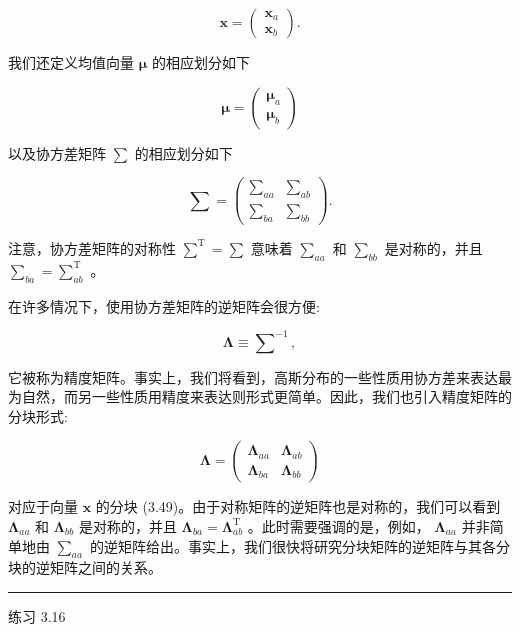 \documentclass[10pt]{article}
\newcommand{\HRule}{\begin{center}\rule{0.9\linewidth}{0.2mm}\end{center}}
\begin{document}
\[
\mathbf{x} = \left( \begin{array}{l} {\mathbf{x}}_{a} \\  {\mathbf{x}}_{b} \end{array}\right) . \tag{3.49}
\]

我们还定义均值向量 \(\mathbf{\mu }\) 的相应划分如下

\[
\mathbf{\mu } = \left( \begin{array}{l} {\mathbf{\mu }}_{a} \\  {\mathbf{\mu }}_{b} \end{array}\right)  \tag{3.50}
\]

以及协方差矩阵 \(\mathbf{\sum }\) 的相应划分如下

\[
\mathbf{\sum } = \left( \begin{array}{ll} {\mathbf{\sum }}_{aa} & {\mathbf{\sum }}_{ab} \\  {\mathbf{\sum }}_{ba} & {\mathbf{\sum }}_{bb} \end{array}\right) . \tag{3.51}
\]

注意，协方差矩阵的对称性 \({\mathbf{\sum }}^{\mathrm{T}} = \mathbf{\sum }\) 意味着 \({\mathbf{\sum }}_{aa}\) 和 \({\mathbf{\sum }}_{bb}\) 是对称的，并且 \({\mathbf{\sum }}_{ba} = {\mathbf{\sum }}_{ab}^{\mathrm{T}}\) 。

在许多情况下，使用协方差矩阵的逆矩阵会很方便:

\[
\mathbf{\Lambda } \equiv  {\mathbf{\sum }}^{-1}, \tag{3.52}
\]

它被称为精度矩阵。事实上，我们将看到，高斯分布的一些性质用协方差来表达最为自然，而另一些性质用精度来表达则形式更简单。因此，我们也引入精度矩阵的分块形式:

\[
\mathbf{\Lambda } = \left( \begin{array}{ll} {\mathbf{\Lambda }}_{aa} & {\mathbf{\Lambda }}_{ab} \\  {\mathbf{\Lambda }}_{ba} & {\mathbf{\Lambda }}_{bb} \end{array}\right)  \tag{3.53}
\]

对应于向量 \(\mathbf{x}\) 的分块 (3.49)。由于对称矩阵的逆矩阵也是对称的，我们可以看到 \({\mathbf{\Lambda }}_{aa}\) 和 \({\mathbf{\Lambda }}_{bb}\) 是对称的，并且 \({\mathbf{\Lambda }}_{ba} = {\mathbf{\Lambda }}_{ab}^{\mathrm{T}}\) 。此时需要强调的是，例如， \({\mathbf{\Lambda }}_{aa}\) 并非简单地由 \({\mathbf{\sum }}_{aa}\) 的逆矩阵给出。事实上，我们很快将研究分块矩阵的逆矩阵与其各分块的逆矩阵之间的关系。

\HRule

练习 3.16
\end{document}
